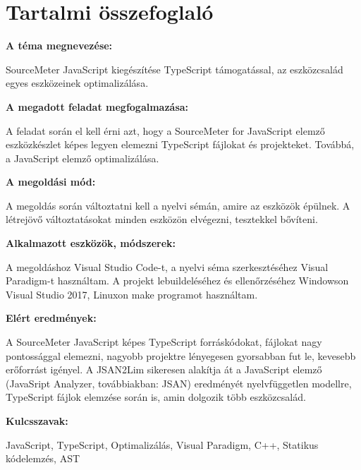 \chapter*{Tartalmi összefoglaló}

\noindent\textbf{A téma megnevezése:}

SourceMeter JavaScript kiegészítése TypeScript támogatással, az eszközcsalád egyes eszközeinek optimalizálása.

\noindent\textbf{A megadott feladat megfogalmazása:}

A feladat során el kell érni azt, hogy a SourceMeter for JavaScript elemző eszközkészlet képes legyen elemezni TypeScript fájlokat és projekteket.
Továbbá, a JavaScript elemző optimalizálása.

\noindent\textbf{A megoldási mód:}

A megoldás során változtatni kell a nyelvi sémán, amire az eszközök épülnek. A létrejövő változtatásokat minden eszközön elvégezni, tesztekkel bővíteni.

\noindent\textbf{Alkalmazott eszközök, módszerek:}

A megoldáshoz Visual Studio Code-t, a nyelvi séma szerkesztéséhez Visual Paradigm-t használtam.
A projekt lebuildeléséhez és ellenőrzéséhez Windowson Visual Studio 2017, Linuxon make programot használtam.

\noindent\textbf{Elért eredmények:}

A SourceMeter JavaScript képes TypeScript forráskódokat, fájlokat nagy pontossággal elemezni, nagyobb projektre lényegesen gyorsabban fut le, kevesebb erőforrást igényel.
A JSAN2Lim sikeresen alakítja át a JavaScript elemző (JavaSript Analyzer, továbbiakban: JSAN) eredményét nyelvfüggetlen modellre, TypeScript fájlok elemzése során is, amin dolgozik több eszközcsalád.

\noindent\textbf{Kulcsszavak:}

JavaScript, TypeScript, Optimalizálás, Visual Paradigm, C++, Statikus kódelemzés, AST
